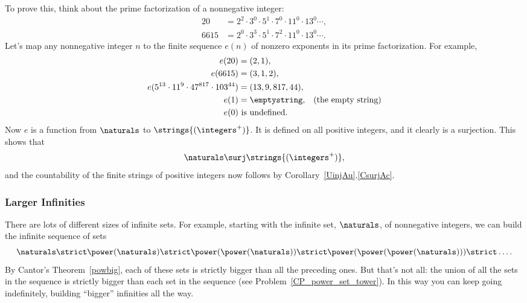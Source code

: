 To prove this, think about the prime factorization of a nonnegative
integer:
\begin{align*}
20 & = 2^2 \cdot 3^0 \cdot 5^1 \cdot 7^0 \cdot 11^0\cdot 13^0 \cdots,\\
6615 & = 2^0 \cdot 3^3 \cdot 5^1 \cdot 7^2 \cdot 11^0\cdot 13^0 \cdots.
\end{align*}
Let's map any nonnegative integer $n$ to the finite sequence $e(n)$ of
nonzero exponents in its prime factorization.  For example,
\begin{align*}
e(20) & = (2,1),\\
e(6615) & = (3,1,2),\\
e(5^{13} \cdot 11^{9} \cdot 47^{817} \cdot 103^{44}) & = (13, 9, 817, 44),\\
e(1) & = \emptystring, & \text{(the empty string)}\\
e(0) & \text{ is undefined}.
\end{align*}
Now $e$ is a function from $\naturals$ to $\strings{(\integers^{+})}$.  It
is defined on all positive integers, and it clearly is a surjection.  This
shows that
\[
\naturals \surj \strings{(\integers^{+})},
\]
and the countability of the finite strings of positive integers now
follows by Corollary~\ref{UinjAu}.\eqref{CsurjAc}.

\iffalse
To prove this, think about putting a decimal point in front of an
infinite bit string to get the decimal expansion of some real number.
That is, putting a decimal point at the beginning of a bit string
defines a function $p:\binw \to \reals$.  For example,
\[
p(000\dots) = .000\dots = 0, \qquad p(1000\dots) = .1000\dots = 1/10,\qquad
p(010101\dots) = .010101\dots = 1/99, \qquad p(11111\dots) = .1111\dots = 1/9\, .
\]
In fact, $p$ is a total function ranging from 0 to 1/9.  Moreover, $p$
is an injection: if two bit strings $s,t \binw$ differ anywhere in
their first $n$ bits, then $p(s)$ and $p(t)$ differ by at least
$8/(9\cdot 10^{n+1})$---a fact which it may amuse you to verify.  This
shows that
\[
\binw \inj \reals.
\]
\fi

\subsubsection{Larger Infinities}

There are lots of different sizes of infinite sets.  For example,
starting with the infinite set, $\naturals$, of nonnegative integers,
we can build the infinite sequence of sets
\[
\naturals \strict \power(\naturals) \strict \power(\power(\naturals))
\strict \power(\power(\power(\naturals))) \strict \dots.
\]
By Cantor's Theorem~\ref{powbig}, each of these sets is strictly
bigger than all the preceding ones.  But that's not all: the union of
all the sets in the sequence is strictly bigger than each set in the
sequence (see Problem~\ref{CP_power_set_tower}).  In this way you can
keep going indefinitely, building ``bigger'' infinities all the way.

